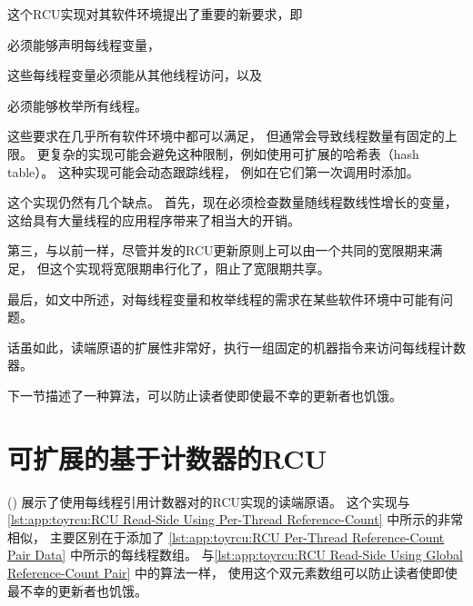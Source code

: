 这个RCU实现对其软件环境提出了重要的新要求，即
%
\begin{enumerate*}[(1)]
\item {}必须能够声明每线程变量，
\item {}这些每线程变量必须能从其他线程访问，以及
\item {}必须能够枚举所有线程。
\end{enumerate*}
%
这些要求在几乎所有软件环境中都可以满足，
但通常会导致线程数量有固定的上限。
更复杂的实现可能会避免这种限制，例如使用可扩展的哈希表（hash table）。
这种实现可能会动态跟踪线程，
例如在它们第一次调用时添加。

\QuickQuizEnd

这个实现仍然有几个缺点。
首先，现在必须检查数量随线程数线性增长的变量，
这给具有大量线程的应用程序带来了相当大的开销。

第三，与以前一样，尽管并发的RCU更新原则上可以由一个共同的宽限期来满足，
但这个实现将宽限期串行化了，阻止了宽限期共享。

最后，如文中所述，对每线程变量和枚举线程的需求在某些软件环境中可能有问题。

话虽如此，读端原语的扩展性非常好，执行一组固定的机器指令来访问每线程计数器。

下一节描述了一种算法，可以防止读者使即使最不幸的更新者也饥饿。

\section{可扩展的基于计数器的RCU}
\label{sec:app:toyrcu:Scalable Counter-Based RCU}

()
展示了使用每线程引用计数器对的RCU实现的读端原语。
这个实现与
\cref{lst:app:toyrcu:RCU Read-Side Using Per-Thread Reference-Count}
中所示的非常相似，
主要区别在于添加了
\cref{lst:app:toyrcu:RCU Per-Thread Reference-Count Pair Data}
中所示的每线程数组。
与\cref{lst:app:toyrcu:RCU Read-Side Using Global Reference-Count Pair}
中的算法一样，
使用这个双元素数组可以防止读者使即使最不幸的更新者也饥饿。

